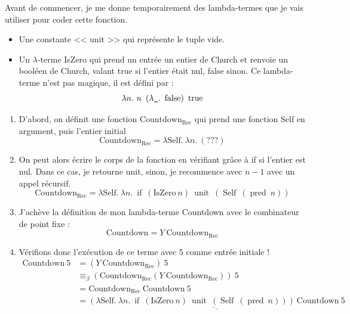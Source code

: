 \documentclass[11pt]{article}
\begin{document}
\begin{remark}
    Avant de commencer, je me donne temporairement des lambda-termes que je vais utiliser pour coder cette fonction.
    \begin{itemize}
        \item Une constante << unit >> qui représente le tuple vide.
        \item Un $\lambda$-terme IsZero qui prend un entrée un entier de Church et renvoie un booléen de Church, valant true si l'entier était nul, false sinon. Ce lambda-terme n'est pas magique, il est défini par :
        $$ \lambda n.~n~\left(\lambda\verb|_|.~\operatorname{false}\right)~\operatorname{true} $$
    \end{itemize}
\end{remark}

\begin{enumerate}
    \item D'abord, on définit une fonction $\text{Countdown}_\text{Rec}$ qui prend une fonction Self en argument, puis l'entier initial
    $$\text{Countdown}_\text{Rec}=\lambda\text{Self}.~\lambda n.~ (???)$$
    \item On peut alors écrire le corps de la fonction en vérifiant grâce à if si l'entier est nul. Dans ce cas, je retourne unit, sinon, je recommence avec $n-1$ avec un appel récursif.
    $$\text{Countdown}_\text{Rec}=\lambda\text{Self}.~\lambda n.~ 
    \operatorname{if}~(\text{IsZero}~n)~\operatorname{unit}~\left(\operatorname{Self}~\left(\operatorname{pred}~n\right)\right)
    $$
    \item J'achève la définition de mon lambda-terme Countdown avec le combinateur de point fixe :
    $$\text{Countdown} = Y~\text{Countdown}_\text{Rec}$$
    \item Vérifions donc l'exécution de ce terme avec 5 comme entrée initiale !
    \begin{equation*}
    \begin{aligned}
        \text{Countdown}~5&=\left(Y~\text{Countdown}_\text{Rec}\right)~5\\
        &\equiv_\beta \left(\text{Countdown}_\text{Rec} \left(Y~\text{Countdown}_\text{Rec}\right)\right)~5\\
        &= \text{Countdown}_\text{Rec}~\text{Countdown} ~5\\
        &=\underline{\underline{\left(\lambda\text{Self}.~\lambda n.~ 
        \operatorname{if}~(\text{IsZero}~n)~\operatorname{unit}~\left(\operatorname{Self}~\left(\operatorname{pred}~n\right)\right)\right)~\text{Countdown}}~5}\\

\end{aligned}
\end{equation*}
\end{enumerate}
\end{document}
